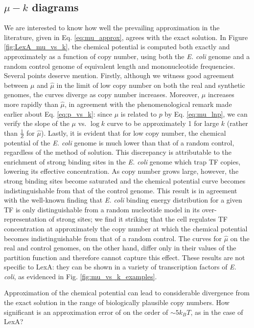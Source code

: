\documentclass{article}
\begin{document}
\subsection{$\mu-k$ diagrams}
We are interested to know how well the prevailing approximation in the
literature, given in Eq. \ref{eq:mu_approx}, agrees with the exact
solution.  In Figure \ref{fig:LexA_mu_vs_k}, the chemical potential is
computed both exactly and approximately as a function of copy number,
using both the \textit{E. coli} genome and a random control genome of
equivalent length and mononucleotide frequencies.  Several points
deserve mention.  Firstly, although we witness good agreement between
$\mu$ and $\hat\mu$ in the limit of low copy number on both the real
and synthetic genomes, the curves diverge as copy number increases.
Moreover, $\mu$ increases more rapidly than $\hat\mu$, in agreement
with the phenomenological remark made earlier about
Eq. \ref{eq:p_vs_k}: since $\mu$ is related to $p$ by Eq.
\ref{eq:mu_lnp}, we can verify the slope of the $\mu$ vs. $\log k$
curve to be approximately 1 for large $k$ (rather than $\frac{1}{Z}$
for $\hat\mu$).  Lastly, it is evident that for low copy number, the
chemical potential of the \textit{E. coli} genome is much lower than
that of a random control, regardless of the method of solution.  This
discrepancy is attributable to the enrichment of strong binding sites
in the \textit{E. coli} genome which trap TF copies, lowering its
effective concentration.  As copy number grows large, however, the
strong binding sites become saturated and the chemical potential curve
becomes indistinguishable from that of the control genome.  This
result is in agreement with the well-known finding that
\textit{E. coli} binding energy distribution for a given TF is only
distinguishable from a random nucleotide model in its
over-representation of strong sites\cite{gerland02}\cite{lassig07}; we
find it striking that the cell regulates TF concentration at
approximately the copy number at which the chemical potential becomes
indistinguishable from that of a random control.  The curves for
$\hat\mu$ on the real and control genomes, on the other hand, differ
only in their values of the partition function and therefore cannot
capture this effect.  These results are not specific to LexA: they can
be shown in a variety of transcription factors of \textit{E. coli}, as
evidenced in Fig. \ref{fig:mu_vs_k_examples}.

Approximation of the chemical potential can lead to considerable
divergence from the exact solution in the range of biologically
plausible copy numbers.  How significant is an approximation error of
on the order of $\sim 5k_BT$, as in the case of LexA?
\end{document}
